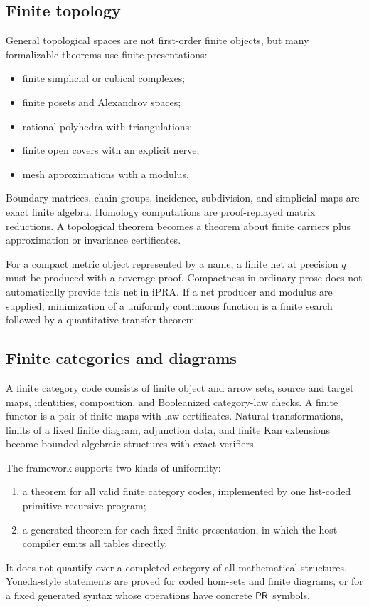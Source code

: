 \subsection{Finite topology}

General topological spaces are not first-order finite objects, but many formalizable theorems use finite
presentations:
\begin{itemize}
  \item finite simplicial or cubical complexes;
  \item finite posets and Alexandrov spaces;
  \item rational polyhedra with triangulations;
  \item finite open covers with an explicit nerve;
  \item mesh approximations with a modulus.
\end{itemize}
Boundary matrices, chain groups, incidence, subdivision, and simplicial maps are exact finite algebra.
Homology computations are proof-replayed matrix reductions.  A topological theorem becomes a theorem about
finite carriers plus approximation or invariance certificates.

For a compact metric object represented by a name, a finite net at precision \(q\) must be produced with a
coverage proof.  Compactness in ordinary prose does not automatically provide this net in iPRA.  If a net
producer and modulus are supplied, minimization of a uniformly continuous function is a finite search
followed by a quantitative transfer theorem.

\subsection{Finite categories and diagrams}

A finite category code consists of finite object and arrow sets, source and target maps, identities,
composition, and Booleanized category-law checks.  A finite functor is a pair of finite maps with law
certificates.  Natural transformations, limits of a fixed finite diagram, adjunction data, and finite Kan
extensions become bounded algebraic structures with exact verifiers.

The framework supports two kinds of uniformity:
\begin{enumerate}
  \item a theorem for all valid finite category codes, implemented by one list-coded primitive-recursive
        program;
  \item a generated theorem for each fixed finite presentation, in which the host compiler emits all
        tables directly.
\end{enumerate}
It does not quantify over a completed category of all mathematical structures.  Yoneda-style statements are
proved for coded hom-sets and finite diagrams, or for a fixed generated syntax whose operations have
concrete \(\mathsf{PR}\) symbols.

